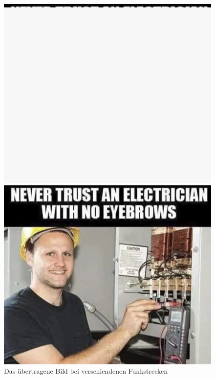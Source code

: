 \begin{figure}[H]
        \vspace{0.5cm}

        \begin{minipage}{0.45\textwidth}
            \centering
            \includegraphics[width=\linewidth]{Pictures/nochwenigergrosserabstand.jpg}
        \end{minipage}
        \hfill
        \begin{minipage}{0.45\textwidth}
            \centering
            \includegraphics[width=\linewidth]{Pictures/kleinerabstand.jpg}  
        \end{minipage}   
    \caption{Das übertragene Bild bei verschiendenen Funkstrecken}
    \label{fig:Task2d} 
    \end{figure}


